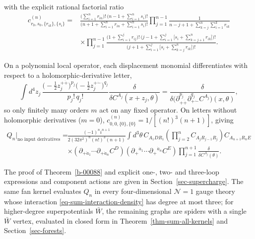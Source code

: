 \documentclass[11pt]{article}
\numberwithin{equation}{section}
\numberwithin{figure}{section}
\numberwithin{table}{section}
\begin{document}
with the explicit rational factorial ratio
\begin{equation}\label{eq-sum-N4-coeff}
\begin{aligned}
c^{(n)}_{r_0,s_0,\{r_{ik}\},\{s_i\}}
={}&\frac{\bigl(\sum_{i=1}^n r_{in}\bigr)!\,\bigl(n-1+\sum_{i=1}^n s_i\bigr)!}
{\bigl(n+1+\sum_{i=1}^n r_{in}+\sum_{i=1}^n s_i\bigr)!}
\prod_{j=1}^{n-1}\frac{1}{n-j+1+\sum_{k=j}^n\sum_{i=1}^k r_{ik}}\\
&\times\prod_{j=1}^{n-1}
\frac{\bigl(1+\sum_{i=1}^j r_{ij}\bigr)!\,
\bigl(j-1+\sum_{i=1}^j\bigl[s_i+\sum_{k=j+1}^n r_{ik}\bigr]\bigr)!}
{\bigl(j+1+\sum_{i=1}^j\bigl[s_i+\sum_{k=j}^n r_{ik}\bigr]\bigr)!}.
\end{aligned}
\end{equation}

On a polynomial local operator, each displacement monomial differentiates with respect to a holomorphic-derivative letter,
\begin{equation}\label{eq-sum-N4-letters}
\int d^4z_j\,
\frac{\bigl(-\tfrac12 z_j^{+\dot+}\bigr)^{p_j}\bigl(-\tfrac12 z_j^{+\dot-}\bigr)^{q_j}}{p_j!\,q_j!}
\frac{\delta}{\delta C^{A_j}(x+z_j,\theta)}
=\frac{\delta}{\delta\bigl(\partial_{+\dot+}^{p_j}\partial_{+\dot-}^{q_j}C^{A_j}\bigr)(x,\theta)},
\end{equation}
so only finitely many orders $m$ act on any fixed operator. On letters without holomorphic derivatives ($m=0$), $c^{(n)}_{0,0,\{0\},\{0\}}=1/[(n!)^3(n+1)]$, giving
\begin{equation}\label{eq-sum-Qnzero}
\begin{aligned}
Q_n\big|_{\text{no input derivatives}}
={}&\frac{(-1)^ni^{n+1}}{2(32\pi^2)^n(n!)^3(n+1)}
\int d^3\theta\,
C_{A_1DR_1}\left(\prod_{j=2}^nC_{A_jR_{j-1}R_j}\right)
C_{A_{n+1}R_nE}\\
&\times(\partial_{+\dot a_1}\cdots\partial_{+\dot a_n}C^D)
(\partial_+{}^{\dot a_1}\cdots\partial_+{}^{\dot a_n}C^E)
\prod_{j=1}^{n+1}\frac{\delta}{\delta C^{A_j}(\theta)}.
\end{aligned}
\end{equation}

The proof of Theorem~\ref{b-00088} and explicit one-, two- and three-loop expressions and component actions are given in Section~\ref{sec-supercharge}. The same fan kernel evaluates $Q_n$ in every four-dimensional $\mathcal N=1$ gauge theory whose interaction \eqref{eq-sum-interaction-density} has degree at most three; for higher-degree superpotentials $\bar W$, the remaining graphs are spiders with a single $\bar W$ vertex, evaluated in closed form in Theorem~\ref{thm-sum-all-kernels} and Section~\ref{sec-forests}.
\end{document}
